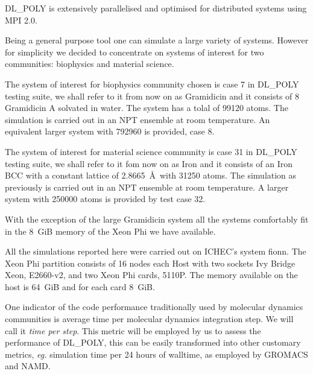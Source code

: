 \par{DL\_POLY is extensively parallelised and optimised for distributed systems using MPI 2.0\cite{mpi1994}.}

\par{Being a general purpose tool one can simulate a large variety of systems. However for simplicity we decided to concentrate
on systems of interest for two communities: biophysics and material science.}

\par{The system of interest for biophysics community chosen is case 7 in DL\_POLY testing suite, we shall refer to it from now on 
as Gramidicin and it consists of 8 Gramidicin A solvated in water. The system has a tolal of 99120 atoms. The simulation is 
carried out in an NPT ensemble at room temperature. An equivalent larger system with 792960 is provided, case 8.}

\par{The system of interest for material science community is case 31 in DL\_POLY testing suite, we shall refer to it fom now on 
as Iron and it consists of an Iron BCC with a constant lattice of 2.8665~\AA~with 31250 atoms. The simulation as previously
is carried out in an NPT ensemble at room temperature. A larger system with 250000 atoms is provided by test case 32.}

\par{With the exception of the large Gramidicin system all the systems comfortably fit in the 8~GiB memory of the 
Xeon Phi we have available.}

\par{All the simulations reported here were carried out on ICHEC's system fionn\cite{fionn}. The Xeon Phi 
partition consists of 16 nodes each Host with two sockets Ivy Bridge Xeon, E2660-v2\cite{xeon}, and 
two Xeon Phi cards, 5110P\cite{xeonphi5110P}. The memory available on the host is 64~GiB and for each card 8~GiB.}

\par{One indicator of the code performance traditionally used by molecular dynamics communities is average time per molecular 
dynamics integration step. We will call it \emph{time per step}. This metric will be employed by us to assess the performance of 
DL\_POLY, this can be easily transformed into other customary metrics, \emph{eg.} simulation time per 24 hours of walltime, as 
employed by GROMACS\cite{Berendsen1995} and NAMD\cite{Kale1999}.}

